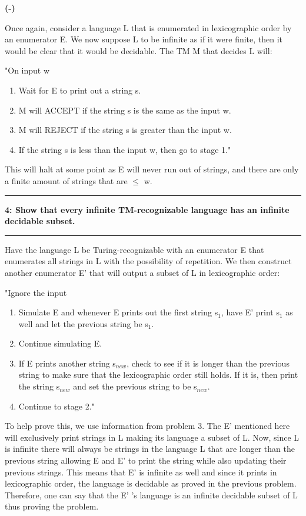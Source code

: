\documentclass[11pt]{article}
\newcommand\question[2]{\vspace{.25in}\hrule\textbf{#1: #2}\vspace{.5em}\hrule\vspace{.10in}}
\renewcommand\part[1]{\vspace{.10in}\textbf{(#1)}\par}
\begin{document}
	\part{-}
	Once again, consider a language L that is enumerated in lexicographic order by an enumerator E. We now suppose L to be infinite as if it were finite, then it would be clear that it would be decidable. The TM M that decides L will:\par
	"On input w
	\begin{enumerate}
		\item Wait for E to print out a string s.
		\item M will ACCEPT if the string s is the same as the input w.
		\item M will REJECT if the string s is greater than the input w.
		\item If the string s is less than the input w, then go to stage 1."
	\end{enumerate}
	This will halt at some point as E will never run out of strings, and there are only a finite amount of strings that are $\leq$ w.
	
\question{4}{Show that every infinite TM-recognizable language has an infinite decidable subset.}
	Have the language L be Turing-recognizable with an enumerator E that enumerates all strings in L with the possibility of repetition. We then construct another enumerator E' that will output a subset of L in lexicographic order:\par
	"Ignore the input
	\begin{enumerate}
		\item Simulate E and whenever E prints out the first string s$_{1}$, have E' print s$_{1}$ as well and let the previous string be s$_{1}$.
		\item Continue simulating E.
		\item If E prints another string s$_{new}$, check to see if it is longer than the previous string to make sure that the lexicographic order still holds. If it is, then print the string s$_{new}$ and set the previous string to be s$_{new}$. 
		\item Continue to stage 2."
	\end{enumerate}	
	To help prove this, we use information from problem 3. The E' mentioned here will exclusively print strings in L making its language a subset of L. Now, since L is infinite there will always be strings in the language L that are longer than the previous string allowing E and E' to print the string while also updating their previous strings. This means that E' is infinite as well and since it prints in lexicographic order, the language is decidable as proved in the previous problem. Therefore, one can say that the E' 's language is an infinite decidable subset of L thus proving the problem.
	
\end{document}
